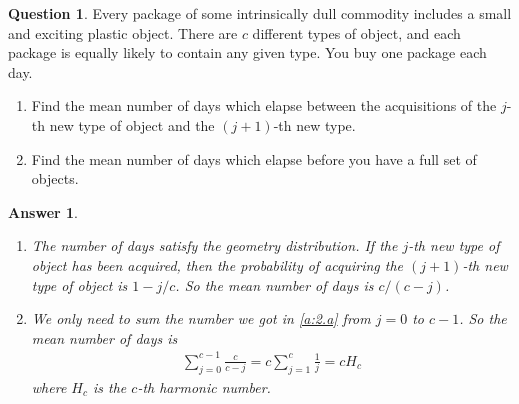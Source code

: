 \documentclass[utf8]{article}
\theoremstyle{definition}%
\newtheorem{question}{Question} %
\theoremstyle{plain}%
\newtheorem{answer}{Answer} %
\begin{document}
\begin{question}
    Every package of some intrinsically dull commodity includes a small and exciting plastic object. There are $c$ different types of object, and each package is equally likely to contain any given type. You buy one package each day.
    \begin{enumerate}[label=(\alph*)]
        \item Find the mean number of days which elapse between the acquisitions of the $j$-th new type of object and the $(j + 1)$-th new type.
        \item Find the mean number of days which elapse before you have a full set of objects.
    \end{enumerate}
\end{question}
\begin{answer} ~
    \begin{enumerate}[label=(\alph*)]
        \item \label{a:2.a} The number of days satisfy the geometry distribution. If the $j$-th new type of object has been acquired, then the probability of acquiring the $(j+1)$-th new type of object is $1 - j/c$. So the mean number of days is $c/(c-j)$.
        \item We only need to sum the number we got in \ref{a:2.a} from $j = 0$ to $c-1$. So the mean number of days is
        \begin{align}
            \sum_{j=0}^{c-1} \frac{c}{c-j} = c \sum_{j=1}^{c} \frac{1}{j} = cH_c
        \end{align}
        where $H_c$ is the $c$-th harmonic number.
    \end{enumerate}
\end{answer}
\end{document}
